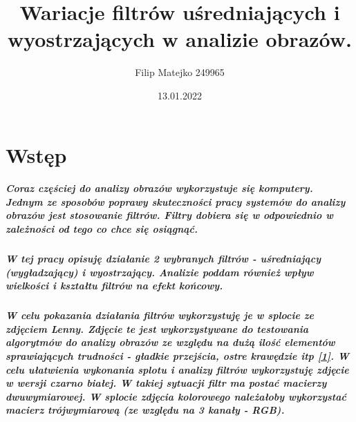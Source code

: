 \documentclass[a4paper,12pt,openany]{report}
\begin{document}
\title{\Large{\textbf{Wariacje filtrów uśredniających i wyostrzających w analizie obrazów.}}}
\author{Filip Matejko 249965}
\date{13.01.2022}
\maketitle

\tableofcontents

\chapter{Wstęp}

\paragraph{\indent Coraz częściej do analizy obrazów wykorzystuje się komputery. Jednym ze sposobów poprawy skuteczności pracy systemów do analizy obrazów jest stosowanie filtrów. Filtry dobiera się w odpowiednio w zależności od tego co chce się osiągnąć.}

\paragraph{\indent W tej pracy opisuję działanie 2 wybranych filtrów - uśredniający (wygładzający) i wyostrzający. Analizie poddam również wpływ wielkości i kształtu filtrów na efekt końcowy.}

\paragraph{\indent W celu pokazania działania filtrów wykorzystuję je w splocie ze zdjęciem Lenny. Zdjęcie te jest wykorzystywane do testowania algorytmów do analizy obrazów ze względu na dużą ilość elementów sprawiających trudności - gładkie przejścia, ostre krawędzie itp \href{https://en.wikipedia.org/wiki/Lenna}{[1]}. W celu ułatwienia wykonania splotu i analizy filtrów wykorzystuję zdjęcie w wersji czarno białej. W takiej sytuacji filtr ma postać macierzy dwuwymiarowej. W splocie zdjęcia kolorowego należałoby wykorzystać macierz trójwymiarową (ze względu na 3 kanały - RGB).}
\end{document}
